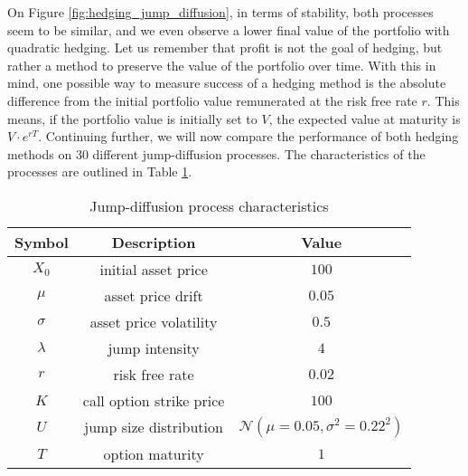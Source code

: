\documentclass[times, utf8, diplomski]{fer}
\begin{document}
\noindent On Figure \ref{fig:hedging_jump_diffusion}, in terms of stability, both processes seem to be similar, and we even observe a lower final value of the portfolio with quadratic hedging. Let us remember that profit is not the goal of hedging, but rather a method to preserve the value of the portfolio over time. With this in mind, one possible way to measure success of a hedging method is the absolute difference from the initial portfolio value remunerated at the risk free rate $r$. This means, if the portfolio value is initially set to $V$, the expected value at maturity is $V\cdot e^{rT}$. Continuing further, we will now compare the performance of both hedging methods on 30 different jump-diffusion processes. The characteristics of the processes are outlined in Table \ref{table:jd_characteristics}. \vspace{0.5cm}

\begin{table}
\centering
\begin{tabular}{c c c}
\hline
Symbol & Description & Value \\
\hline \hline
$X_0$ & initial asset price & $100$ \\
\hline
$\mu$ & asset price drift & $0.05$ \\
\hline
$\sigma$ & asset price volatility & $0.5$ \\
\hline
$\lambda$ & jump intensity & $4$ \\
\hline
$r$ & risk free rate & $0.02$ \\
\hline
$K$ & call option strike price & $100$ \\
\hline
$U$ & jump size distribution & $\mathcal{N}(\mu=0.05, \sigma^2 = 0.22^2)$ \\
\hline
$T$ & option maturity & $1$ \\
\hline
\end{tabular}
\caption{Jump-diffusion process characteristics}
\label{table:jd_characteristics}
\end{table}
\end{document}
